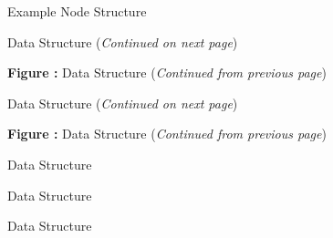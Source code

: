\newpage
\setlength{\unitlength}{\baselineskip}	%
\begin{figure}[!htp]
\centering
\resizebox{\linewidth}{!}{}
\caption{Example Node Structure}
\label{f:example_node}
\end{figure}

\clearpage
\begin{figure}[!htp]
\centering
\resizebox{\linewidth}{!}{}
\caption[ Data Structure]{ Data Structure (\textit{Continued on next page})}
\label{f:CGNSBase}
\end{figure}
\clearpage
\begin{figure}[!htp]
\centering
\resizebox{\linewidth}{!}{}
\par\vspace{\abovecaptionskip}
\textbf{Figure :}  Data Structure (\textit{Continued from previous page})
\end{figure}

\clearpage
\begin{figure}[!htp]
\centering
\resizebox{\linewidth}{!}{}
\caption[ Data Structure]{ Data Structure (\textit{Continued on next page})}
\label{f:Zone}
\end{figure}
\clearpage
\begin{figure}[!htp]
\centering
\resizebox{\linewidth}{!}{}
\par\vspace{\abovecaptionskip}
\textbf{Figure :}  Data Structure (\textit{Continued from previous page})
\end{figure}

\clearpage
\begin{figure}[!htp]
\centering

\caption{ Data Structure}
\label{f:GridCoordinates}
\end{figure}

\clearpage
\begin{figure}[!htp]
\centering

\caption{ Data Structure}
\label{f:Elements}
\end{figure}

\clearpage
\begin{figure}[!htp]
\centering
%
\resizebox{\linewidth}{!}{}
\caption{ Data Structure}
\label{f:Axisymmetry}
\end{figure}

